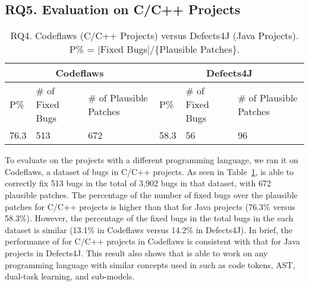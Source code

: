 \subsection{\bf RQ5. Evaluation on C/C++ Projects}
\label{sec:eval-c}

\begin{table}[t]
	\caption{RQ4. Codeflaws (C/C++ Projects) versus Defects4J (Java Projects). P\% = $|$Fixed Bugs$|$/\{Plausible Patches\}.}
	\vspace{-5pt}
	{\footnotesize
		\begin{center}
			\tabcolsep 2.7pt
			\begin{tabular}{p{0.5cm}<{\centering}|p{1.5cm}<{\centering}|p{1.55cm}<{\centering}|p{0.5cm}<{\centering}|p{1.5cm}<{\centering}|p{1.55cm}<{\centering}}\hline	
				
				\multicolumn{3}{c|}{Codeflaws } & \multicolumn{3}{c}{Defects4J}\\\hline
				 P\%& \# of Fixed Bugs& \# of Plausible Patches &P\%& \# of Fixed Bugs & \# of Plausible Patches \\ \hline
				
				  76.3  &        513       &            672             &  58.3 &          56        &        96                 \\
				\hline

			\end{tabular}
			\label{RQ5}
		\end{center}
	}
\end{table}
  
To evaluate {\tool} on the projects with a different programming
language, we ran it on Codeflaws, a dataset of bugs in C/C++ projects.
As seen in Table~\ref{RQ5}, {\tool} is able to correctly fix 513 bugs
in the total of 3,902 bugs in that dataset, with 672 plausible
patches. The percentage of the number of fixed bugs over the plausible
patches for C/C++ projects is higher than that for Java projects
(76.3\% versus 58.3\%). However, the percentage of the fixed bugs in
the total bugs in the each dataset is similar (13.1\% in Codeflaws
versus 14.2\% in Defects4J). In brief, the performance of {\tool} for
C/C++ projects in Codeflaws is consistent with that for Java projects
in Defects4J. This result also shows that {\tool} is able to work on
any programming language with similar concepts used in {\tool} such as
code tokens, AST, dual-task learning, and sub-models.







